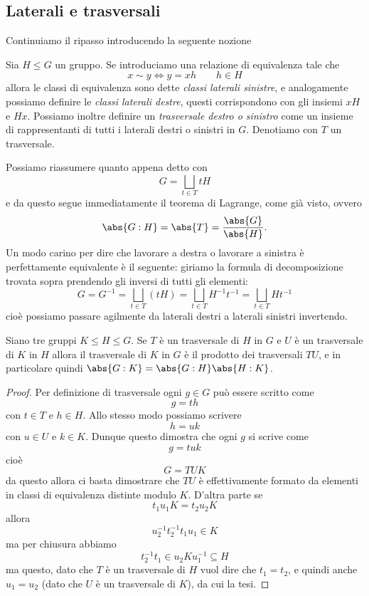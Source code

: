 \documentclass[11pt]{scrartcl}
\begin{document}
	\subsection{Laterali e trasversali}
	
	Continuiamo il ripasso introducendo la seguente nozione
	\begin{definition}
		Sia $H\le G$ un gruppo. Se introduciamo una relazione di equivalenza tale che
		$$x\sim y \iff y = xh \qquad h\in H$$
		allora le classi di equivalenza sono dette \textit{classi laterali sinistre}, e analogamente possiamo definire le \textit{classi laterali destre}, questi corrispondono con gli insiemi $xH$ e $Hx$. Possiamo inoltre definire un \textit{trasversale destro o sinistro} come un insieme di rappresentanti di tutti i laterali destri o sinistri in $G$. Denotiamo con $T$ un trasversale.
	\end{definition}
	Possiamo riassumere quanto appena detto con
	$$G=\bigsqcup_{t\in T}tH$$
	e da questo segue immediatamente il teorema di Lagrange, come già visto, ovvero
	$$\abs{G:H}=\abs{T}=\frac{\abs{G}}{\abs{H}}.$$
	Un modo carino per dire che lavorare a destra o lavorare a sinistra è perfettamente equivalente è il seguente: giriamo la formula di decomposizione trovata sopra prendendo gli inversi di tutti gli elementi:
	$$G=G^{-1}=\bigsqcup_{t\in T}\left(tH\right)=\bigsqcup_{t\in T}H^{-1}t^{-1}=\bigsqcup_{t\in T}Ht^{-1}$$
	cioè possiamo passare agilmente da laterali destri a laterali sinistri invertendo.
	\begin{proposition}
		Siano tre gruppi $K\le H \le G$. Se $T$ è un trasversale di $H$ in $G$ e $U$ è un trasversale di $K$ in $H$ allora il trasversale di $K$ in $G$ è il prodotto dei trasversali $TU$, e in particolare quindi $\abs{G:K}=\abs{G:H}\abs{H:K}$.
	\end{proposition}
	\begin{proof}
		Per definizione di trasversale ogni $g\in G$ può essere scritto come
		$$g=th$$
		con $t\in T$ e $h\in H$. Allo stesso modo possiamo scrivere
		$$h=uk$$
		con $u\in U$ e $k\in K$. Dunque questo dimostra che ogni $g$ si scrive come
		$$g=tuk$$
		cioè
		$$G=TUK$$
		da questo allora ci basta dimostrare che $TU$ è effettivamente formato da elementi in classi di equivalenza distinte modulo $K$. D'altra parte se
		$$t_1u_1K=t_2u_2K$$
		allora 
		$$u_2^{-1}t_2^{-1}t_1u_1\in K$$
		ma per chiusura abbiamo
		$$t_2^{-1}t_1\in u_2Ku_1^{-1}\subseteq H$$
		ma questo, dato che $T$ è un trasversale di $H$ vuol dire che $t_1=t_2$, e quindi anche $u_1=u_2$ (dato che $U$ è un trasversale di $K$), da cui la tesi.
	\end{proof}
\end{document}
